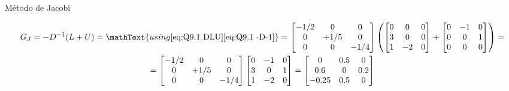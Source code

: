 \documentclass[CN_A-Tests_Resolutions.tex]{subfiles}
\begin{document}
\begin{questionBox}
\begin{questionBox}
    Método de Jacobi
    \begin{tcolorbox}
      \begin{gather}
        G_J
        = -D^{-1}(L+U)
        = \mathText{using 
          \eqref{eq:Q9.1 DLU}
          \eqref{eq:Q9.1 -D-1}
        }
        = 
        \begin{bmatrix}
          -1/2 &  0 & 0
          \\ 0 & +1/5 & 0
          \\ 0 &  0 & -1/4
        \end{bmatrix}
        \left(
          \begin{bmatrix}
            0 &  0 & 0
            \\ 3 &  0 & 0
            \\ 1 & -2 & 0
          \end{bmatrix}
          + \begin{bmatrix}
            0 & -1 & 0
            \\ 0 &  0 & 1
            \\ 0 &  0 & 0
          \end{bmatrix}
        \right)
        = \\
        = \begin{bmatrix}
          -1/2 & 0    & 0 \\
          0    & +1/5 & 0 \\
          0    & 0    & -1/4
        \end{bmatrix}
        \begin{bmatrix}
          0    & -1   & 0 \\
          3    & 0    & 1 \\
          1    & -2   & 0
        \end{bmatrix}
        = \begin{bmatrix}
          0     & 0.5 & 0   \\
          0.6   & 0   & 0.2 \\
          -0.25 & 0.5 & 0
        \end{bmatrix}
        \label{eq:Q9.1 GJ}
      \end{gather}
    \end{tcolorbox}


\end{questionBox}
\end{questionBox}
\end{document}
